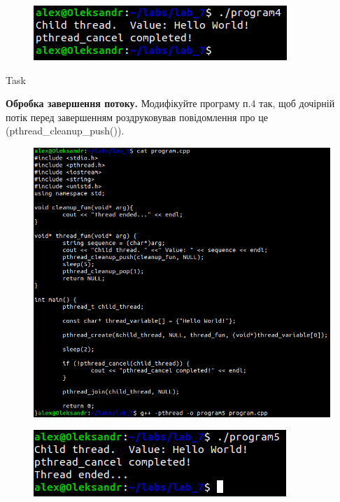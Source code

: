 \documentclass[a4paper,12pt]{article}
\newcommand{\RomanNumeralCaps}[1]{\MakeUppercase{\romannumeral #1}}
\begin{document}
\newpage
    \begin{figure}[h!]
        \begin{minipage}[h]{1\linewidth}
            \centering
            \includegraphics[width=0.6\linewidth]{Prt sc/Figure_4_2.png}  
        \end{minipage}
    \end{figure}
    \begin{center}
        \Large{Task \RomanNumeralCaps{5}}
    \end{center}
    \textbf{Обробка завершення потоку.} Модифікуйте програму п.4 так, щоб дочірній потік перед завершенням
    роздруковував повідомлення про це (pthread\_cleanup\_push()).
    \begin{figure}[h!]
        \begin{minipage}[h]{1\linewidth}
            \centering
            \includegraphics[width=0.6\linewidth]{Prt sc/Figure_5_1.png}  
        \end{minipage}
    \end{figure}
    \begin{figure}[h!]
        \begin{minipage}[h]{1\linewidth}
            \centering
            \includegraphics[width=0.6\linewidth]{Prt sc/Figure_5_2.png}  
        \end{minipage}
    \end{figure}
\end{document}
